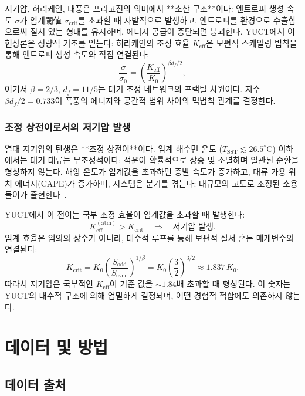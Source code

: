 \documentclass[11pt,a4paper]{article}
\newcommand{\Keff}{K_{\mathrm{eff}}}
\begin{document}
	저기압, 허리케인, 태풍은 프리고진의 의미에서 **소산 구조**이다: 엔트로피 생성 속도 $\sigma$가 임계閾値 $\sigma_{\mathrm{crit}}$를 초과할 때 자발적으로 발생하고, 엔트로피를 환경으로 수출함으로써 질서 있는 형태를 유지하며, 에너지 공급이 중단되면 붕괴한다. YUCT에서 이 현상론은 정량적 기초를 얻는다: 허리케인의 조정 효율 $\Keff$은 보편적 스케일링 법칙을 통해 엔트로피 생성 속도와 직접 연결된다:
	\begin{equation}
		\frac{\sigma}{\sigma_0} = \left( \frac{\Keff}{K_0} \right)^{\beta d_f / 2},
		\label{eq:cyclone_sigma}
	\end{equation}
	여기서 $\beta = 2/3$, $d_f = 11/5$는 대기 조정 네트워크의 프랙털 차원이다. 지수 $\beta d_f / 2 = 0.733$이 폭풍의 에너지와 공간적 범위 사이의 멱법칙 관계를 결정한다.
	
	\subsubsection*{조정 상전이로서의 저기압 발생}
	
	열대 저기압의 탄생은 **조정 상전이**이다. 임계 해수면 온도 ($T_{\mathrm{SST}} \lesssim 26.5^{\circ}\mathrm{C}$) 이하에서는 대기 대류는 무조정적이다: 적운이 확률적으로 상승 및 소멸하며 일관된 순환을 형성하지 않는다. 해양 온도가 임계값을 초과하면 증발 속도가 증가하고, 대류 가용 위치 에너지(CAPE)가 증가하며, 시스템은 분기를 겪는다: 대규모의 고도로 조정된 소용돌이가 출현한다~\cite{Emanuel2003}.
	
	YUCT에서 이 전이는 국부 조정 효율이 임계값을 초과할 때 발생한다:
	\begin{equation}
		\Keff^{\mathrm{(atm)}} > K_{\mathrm{crit}} \quad \Longrightarrow \quad
		\text{저기압 발생}.
	\end{equation}
	임계 효율은 임의의 상수가 아니라, 대수적 루프를 통해 보편적 질서-혼돈 매개변수와 연결된다:
	\begin{equation}
		K_{\mathrm{crit}} = K_0 \left( \frac{S_{\mathrm{odd}}}{S_{\mathrm{even}}} \right)^{1/\beta}
		= K_0 \left( \frac{3}{2} \right)^{3/2} \approx 1.837\,K_0 .
	\end{equation}
	따라서 저기압은 국부적인 $K_{\mathrm{eff}}$이 기준 값을 $\sim 1.84$배 초과할 때 형성된다. 이 숫자는 YUCT의 대수적 구조에 의해 엄밀하게 결정되며, 어떤 경험적 적합에도 의존하지 않는다.
	
	\section{데이터 및 방법}
	
	\subsection{데이터 출처}
	
\end{document}
